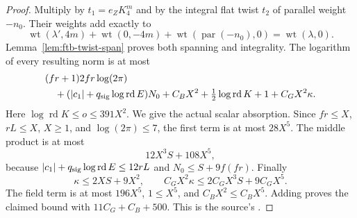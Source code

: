 \begin{proof}
Multiply by \(t_1=e_ZK_4^m\) and by the integral flat twist \(t_2\)
of parallel weight \(-n_0\).
Their weights add exactly to
\[
 \operatorname{wt}(\lambda',4m)+
 \operatorname{wt}(0,-4m)+
 \operatorname{wt}(\operatorname{par}(-n_0),0)
                                  =\operatorname{wt}(\lambda,0).
\]
Lemma~\ref{lem:ftb-twist-span} proves both spanning and integrality.
The logarithm of every resulting norm is at most
\begin{align*}
 &(fr+1)2fr\log(2\pi)\\
 &\quad+(|c_1|+q_{\rm sig}\log\operatorname{rd}E)N_0
       +C_BX^2+\tfrac12\log\operatorname{rd}K+1
       +C_GX^2\kappa .
\end{align*}
Here \(\log\operatorname{rd}K\le o\le391X^2\).
We give the actual scalar absorption.
Since \(fr\le X\), \(rL\le X\), \(X\ge1\), and
\(\log(2\pi)\le7\), the first term is at most \(28X^5\).
The middle product is at most
\[
                  12X^3S+108X^5 ,
\]
because \(|c_1|+q_{\rm sig}\log\operatorname{rd}E\le12rL\)
and \(N_0\le S+9f(fr)\).
Finally
\[
    \kappa\le2XS+9X^2,\qquad
    C_GX^2\kappa\le2C_GX^3S+9C_GX^5.
\]
The field term is at most \(196X^5\), \(1\le X^5\), and
\(C_BX^2\le C_BX^5\).
Adding proves the claimed bound with \(11C_G+C_B+500\).
This is the source's
.
\end{proof}

